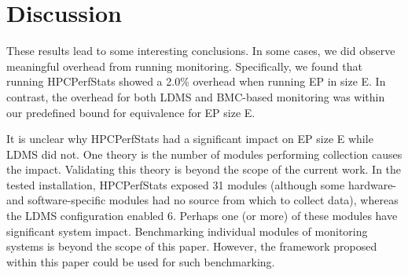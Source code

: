 \documentclass[conference]{IEEEtran}
\begin{document}


\section{Discussion} \label{discussion}

These results lead to some interesting conclusions. In some cases, we did 
observe meaningful overhead from running monitoring. Specifically, we 
found that running 
HPCPerfStats showed a 2.0\% overhead when running 
EP in size E.
In contrast, the overhead for both LDMS and BMC-based monitoring was within our 
predefined bound for equivalence for EP size E.

It is unclear why HPCPerfStats had a significant impact on EP size E 
while LDMS did not. 
One theory is the number of modules performing collection causes the impact. 
Validating this theory is beyond the scope of the current work.
In the tested installation, HPCPerfStats exposed 31 modules (although some hardware- and software-specific modules had no source from which to collect data), whereas the LDMS configuration enabled 6. Perhaps one (or more) of these modules have significant 
system impact. Benchmarking individual modules of monitoring systems is beyond 
the scope of this paper. However, the framework proposed within this paper 
could be used for such benchmarking.
\end{document}
